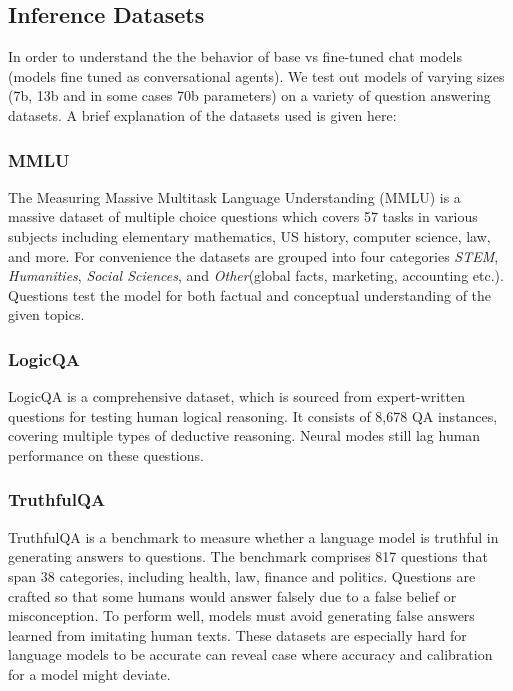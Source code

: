 \documentclass[11pt]{article}
\begin{document}
\subsection{Inference Datasets}

In order to understand the the behavior of base vs fine-tuned chat models 
(models fine tuned as conversational agents). We test out models of varying sizes 
(7b, 13b and in some cases 70b parameters) on a variety of question answering datasets. 
A brief explanation of the datasets used is given here:

\subsubsection{MMLU}

The Measuring Massive Multitask Language Understanding (MMLU) 
\cite{hendryckstest2021} \cite{hendrycks2021ethics} is a massive dataset of 
multiple choice questions which covers 57 tasks in various subjects including elementary mathematics, 
US history, computer science, law, and more. For convenience the datasets are grouped into 
four categories \emph{STEM}, \emph{Humanities}, \emph{Social Sciences}, 
and \emph{Other}(global facts, marketing, accounting etc.). 
Questions test the model for both factual and conceptual understanding 
of the given topics.

\subsubsection{LogicQA}

LogicQA \cite{liu2020logiqa} is a comprehensive dataset, which is sourced 
from expert-written questions for testing human logical reasoning. It consists of 8,678 QA 
instances, covering multiple types of deductive reasoning. Neural modes 
still lag human performance on these questions.

\subsubsection{TruthfulQA}

TruthfulQA \cite{lin2021truthfulqa} is a benchmark to measure whether 
a language model is truthful in generating answers to questions. The benchmark comprises 
817 questions that span 38 categories, including health, law, finance and politics. 
Questions are crafted so that some humans would answer falsely due to a false belief or misconception. 
To perform well, models must avoid generating false answers learned from imitating human texts. These 
datasets are especially hard for language models 
to be accurate can reveal case where accuracy 
and calibration for a model might deviate. 
\end{document}
